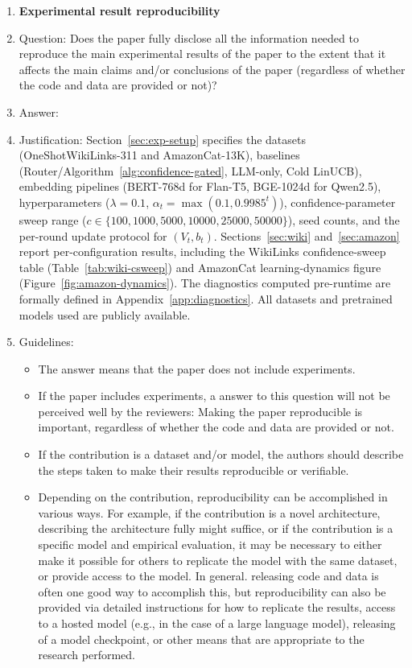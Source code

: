 \documentclass{article}
\theoremstyle{definition}
\theoremstyle{remark}
\theoremstyle{remark}
\begin{document}
\begin{enumerate}
    \item {\bf Experimental result reproducibility}
    \item[] Question: Does the paper fully disclose all the information needed to reproduce the main experimental results of the paper to the extent that it affects the main claims and/or conclusions of the paper (regardless of whether the code and data are provided or not)?
    \item[] Answer: \answerYes{} %
    \item[] Justification: Section~\ref{sec:exp-setup} specifies the datasets (OneShotWikiLinks-311 and AmazonCat-13K), baselines (Router/Algorithm~\ref{alg:confidence-gated}, LLM-only, Cold LinUCB), embedding pipelines (BERT-768d for Flan-T5, BGE-1024d for Qwen2.5), hyperparameters ($\lambda=0.1$, $\alpha_t=\max(0.1, 0.9985^t)$), confidence-parameter sweep range ($c\in\{100, 1000, 5000, 10000, 25000, 50000\}$), seed counts, and the per-round update protocol for $(V_t,b_t)$. Sections~\ref{sec:wiki} and~\ref{sec:amazon} report per-configuration results, including the WikiLinks confidence-sweep table (Table~\ref{tab:wiki-csweep}) and AmazonCat learning-dynamics figure (Figure~\ref{fig:amazon-dynamics}). The diagnostics computed pre-runtime are formally defined in Appendix~\ref{app:diagnostics}. All datasets and pretrained models used are publicly available.
    \item[] Guidelines:
    \begin{itemize}
        \item The answer \answerNA{} means that the paper does not include experiments.
        \item If the paper includes experiments, a \answerNo{} answer to this question will not be perceived well by the reviewers: Making the paper reproducible is important, regardless of whether the code and data are provided or not.
        \item If the contribution is a dataset and\slash or model, the authors should describe the steps taken to make their results reproducible or verifiable. 
        \item Depending on the contribution, reproducibility can be accomplished in various ways. For example, if the contribution is a novel architecture, describing the architecture fully might suffice, or if the contribution is a specific model and empirical evaluation, it may be necessary to either make it possible for others to replicate the model with the same dataset, or provide access to the model. In general. releasing code and data is often one good way to accomplish this, but reproducibility can also be provided via detailed instructions for how to replicate the results, access to a hosted model (e.g., in the case of a large language model), releasing of a model checkpoint, or other means that are appropriate to the research performed.

\end{itemize}
\end{enumerate}
\end{document}
